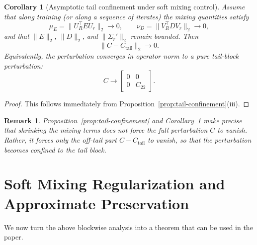 \documentclass[11pt]{article}
\newtheorem{corollary}{Corollary}
\newtheorem{remark}{Remark}
\begin{document}
\begin{corollary}[Asymptotic tail confinement under soft mixing control]
\label{cor:asymptotic-tail}
Assume that along training (or along a sequence of iterates) the mixing quantities satisfy
\[
\mu_E = \|U_R^\top E U_r\|_2 \to 0,
\qquad
\nu_D = \|V_R^\top D V_r\|_2 \to 0,
\]
and that \(\|E\|_2\), \(\|D\|_2\), and \(\|\Sigma_r'\|_2\) remain bounded.
Then
\[
\|C-C_{\mathrm{tail}}\|_2 \to 0.
\]
Equivalently, the perturbation converges in operator norm to a pure tail-block perturbation:
\[
C \to
\begin{bmatrix}
0 & 0\\
0 & C_{22}
\end{bmatrix}.
\]
\end{corollary}

\begin{proof}
This follows immediately from Proposition~\ref{prop:tail-confinement}(iii).
\end{proof}

\begin{remark}
Proposition~\ref{prop:tail-confinement} and Corollary~\ref{cor:asymptotic-tail}
make precise that shrinking the mixing terms does \emph{not} force the full perturbation \(C\) to vanish.
Rather, it forces only the \emph{off-tail part}
\(
C-C_{\mathrm{tail}}
\)
to vanish, so that the perturbation becomes confined to the tail block.
\end{remark}


\section{Soft Mixing Regularization and Approximate Preservation}

We now turn the above blockwise analysis into a theorem that can be used in the paper.
\end{document}
